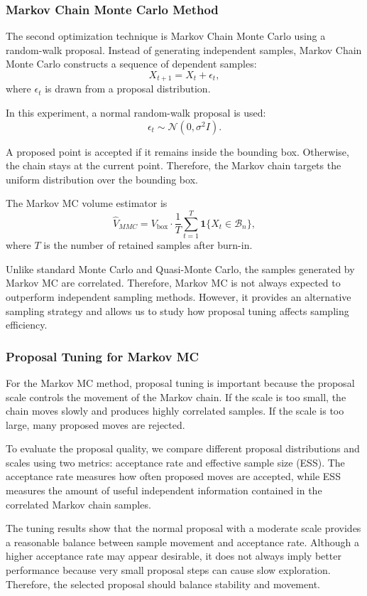 \subsubsection{Markov Chain Monte Carlo Method}

The second optimization technique is Markov Chain Monte Carlo using a random-walk proposal. Instead of generating independent samples, Markov Chain Monte Carlo constructs a sequence of dependent samples:
\[
X_{t+1} = X_t + \epsilon_t,
\]
where $\epsilon_t$ is drawn from a proposal distribution.

In this experiment, a normal random-walk proposal is used:
\[
\epsilon_t \sim \mathcal{N}(0, \sigma^2 I).
\]

A proposed point is accepted if it remains inside the bounding box. Otherwise, the chain stays at the current point. Therefore, the Markov chain targets the uniform distribution over the bounding box.

The Markov MC volume estimator is
\[
\widehat{V}_{MMC}
=
V_{\text{box}}
\cdot
\frac{1}{T}
\sum_{t=1}^{T}
\mathbf{1}\{X_t \in \mathcal{B}_n\},
\]
where $T$ is the number of retained samples after burn-in.

Unlike standard Monte Carlo and Quasi-Monte Carlo, the samples generated by Markov MC are correlated. Therefore, Markov MC is not always expected to outperform independent sampling methods. However, it provides an alternative sampling strategy and allows us to study how proposal tuning affects sampling efficiency.

\subsubsection{Proposal Tuning for Markov MC}

For the Markov MC method, proposal tuning is important because the proposal scale controls the movement of the Markov chain. If the scale is too small, the chain moves slowly and produces highly correlated samples. If the scale is too large, many proposed moves are rejected.

To evaluate the proposal quality, we compare different proposal distributions and scales using two metrics: acceptance rate and effective sample size (ESS). The acceptance rate measures how often proposed moves are accepted, while ESS measures the amount of useful independent information contained in the correlated Markov chain samples.

The tuning results show that the normal proposal with a moderate scale provides a reasonable balance between sample movement and acceptance rate. Although a higher acceptance rate may appear desirable, it does not always imply better performance because very small proposal steps can cause slow exploration. Therefore, the selected proposal should balance stability and movement.

